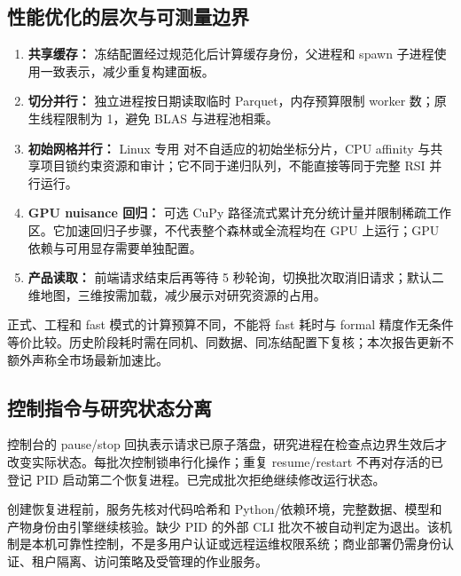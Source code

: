 \subsection{性能优化的层次与可测量边界}
\begin{enumerate}[leftmargin=2em]
\item \textbf{共享缓存：} 冻结配置经过规范化后计算缓存身份，父进程和 spawn 子进程使用一致表示，减少重复构建面板。
\item \textbf{切分并行：} 独立进程按日期读取临时 Parquet，内存预算限制 worker 数；原生线程限制为 1，避免 BLAS 与进程池相乘。
\item \textbf{初始网格并行：} Linux 专用  对不自适应的初始坐标分片，CPU affinity 与共享项目锁约束资源和审计；它不同于递归队列，不能直接等同于完整 RSI 并行运行。
\item \textbf{GPU nuisance 回归：} 可选 CuPy 路径流式累计充分统计量并限制稀疏工作区。它加速回归子步骤，不代表整个森林或全流程均在 GPU 上运行；GPU 依赖与可用显存需要单独配置。
\item \textbf{产品读取：} 前端请求结束后再等待 5 秒轮询，切换批次取消旧请求；默认二维地图，三维按需加载，减少展示对研究资源的占用。
\end{enumerate}
正式、工程和 fast 模式的计算预算不同，不能将 fast 耗时与 formal 精度作无条件等价比较。历史阶段耗时需在同机、同数据、同冻结配置下复核；本次报告更新不额外声称全市场最新加速比。
\subsection{控制指令与研究状态分离}
控制台的 pause/stop 回执表示请求已原子落盘，研究进程在检查点边界生效后才改变实际状态。每批次控制锁串行化操作；重复 resume/restart 不再对存活的已登记 PID 启动第二个恢复进程。已完成批次拒绝继续修改运行状态。

创建恢复进程前，服务先核对代码哈希和 Python/依赖环境，完整数据、模型和产物身份由引擎继续核验。缺少 PID 的外部 CLI 批次不被自动判定为退出。该机制是本机可靠性控制，不是多用户认证或远程运维权限系统；商业部署仍需身份认证、租户隔离、访问策略及受管理的作业服务。